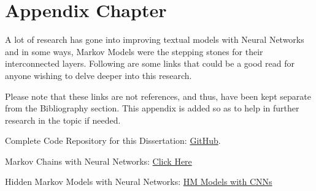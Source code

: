 \appendix
\chapter{Appendix Chapter}

A lot of research has gone into improving textual models with Neural Networks and in some ways, Markov Models were the stepping stones for their interconnected layers. Following are some links that could be a good read for anyone wishing to delve deeper into this research.

Please note that these links are not references, and thus, have been kept separate from the Bibliography section. This appendix is added so as to help in further research in the topic if needed.

Complete Code Repository for this Dissertation: \href{https://github.com/saranshbh/Uni-of-Leeds-22-Dissertation}{GitHub}.

Markov Chains with Neural Networks: \href{https://www.tnt.uni-hannover.de/papers/data/1276/Awiszus_Markov_Chain_NNs.pdf}{Click Here}

Hidden Markov Models with Neural Networks: \href{https://arxiv.org/abs/2102.11038}{HM Models with CNNs}

